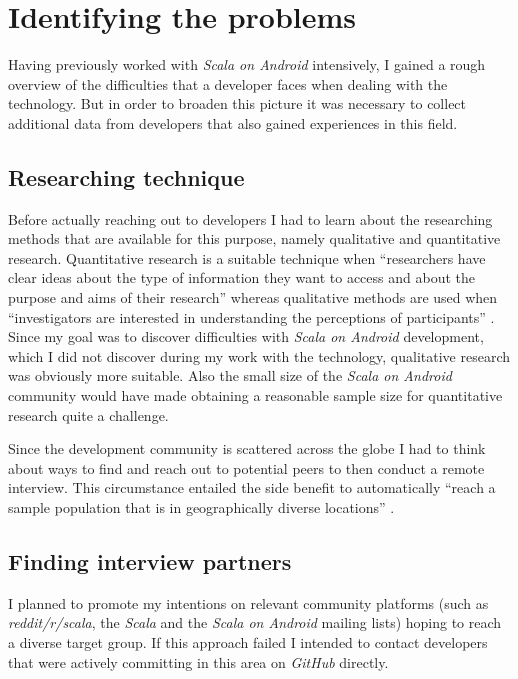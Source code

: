 \section{Identifying the problems}

Having previously worked with \textit{Scala on Android} intensively, I gained a rough overview of the difficulties that a developer faces when dealing with the technology. But in order to broaden this picture it was necessary to collect additional data from developers that also gained experiences in this field.

\subsection{Researching technique}

Before actually reaching out to developers I had to learn about the researching methods that are available for this purpose, namely qualitative and quantitative research. Quantitative research is a suitable technique when \enquote{researchers have clear ideas about the type of information they want to access and about the purpose and aims of their research} \cite[p. 72]{berg01} whereas qualitative methods are used when \enquote{investigators are interested in understanding the perceptions of participants} \cite[p. 72]{berg01}. Since my goal was to discover difficulties with \textit{Scala on Android} development, which I did not discover during my work with the technology, qualitative research was obviously more suitable. Also the small size of the \textit{Scala on Android} community would have made obtaining a reasonable sample size for quantitative research quite a challenge.

Since the development community is scattered across the globe I had to think about ways to find and reach out to potential peers to then conduct a remote interview. This circumstance entailed the side benefit to automatically \enquote{reach a sample population that is in geographically diverse locations} \cite[p. 82]{berg01}.

\subsection{Finding interview partners}

I planned to promote my intentions on relevant community platforms (such as \textit{reddit/r/scala}, the \textit{Scala} and the \textit{Scala on Android} mailing lists) hoping to reach a diverse target group. If this approach failed I intended to contact developers that were actively committing in this area on \textit{GitHub} directly.

